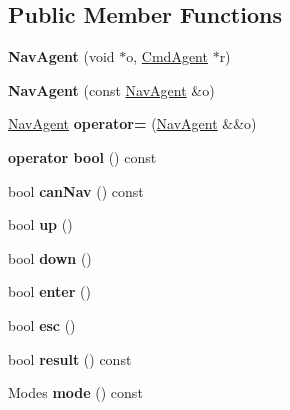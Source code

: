 \subsection*{Public Member Functions}
\begin{DoxyCompactItemize}
\item 
\mbox{\label{structNavAgent_ab1040e3019d1b47d64727a606c41436f}} 
{\bfseries Nav\+Agent} (void $\ast$o, \hyperlink{structCmdAgent}{Cmd\+Agent} $\ast$r)
\item 
\mbox{\label{structNavAgent_a26cd7189c220d855ac814de8d0beaa05}} 
{\bfseries Nav\+Agent} (const \hyperlink{structNavAgent}{Nav\+Agent} \&o)
\item 
\mbox{\label{structNavAgent_a6daf32fef333fa9a479c51270362ceb7}} 
\hyperlink{structNavAgent}{Nav\+Agent} {\bfseries operator=} (\hyperlink{structNavAgent}{Nav\+Agent} \&\&o)
\item 
\mbox{\label{structNavAgent_a4b15b07c152a0dc5348c88ca1595c6d5}} 
{\bfseries operator bool} () const
\item 
\mbox{\label{structNavAgent_a4bab30c7db65ca0023d1cfbda8459fdd}} 
bool {\bfseries can\+Nav} () const
\item 
\mbox{\label{structNavAgent_ad7922b692ca111e47ca603bd9c578297}} 
bool {\bfseries up} ()
\item 
\mbox{\label{structNavAgent_ab39959e3b1a2b958dfa6a15f6d1ce864}} 
bool {\bfseries down} ()
\item 
\mbox{\label{structNavAgent_abbf23487e6d44743f6a16611cc003511}} 
bool {\bfseries enter} ()
\item 
\mbox{\label{structNavAgent_a024b5b6266837683569606acd2fab5ed}} 
bool {\bfseries esc} ()
\item 
\mbox{\label{structNavAgent_a953668fa3d7517c4fa6c1d54b4d7e551}} 
bool {\bfseries result} () const
\item 
\mbox{\label{structNavAgent_a574e7ad5bd62ea9a6a5fa1cf722164d5}} 
Modes {\bfseries mode} () const
\end{DoxyCompactItemize}
